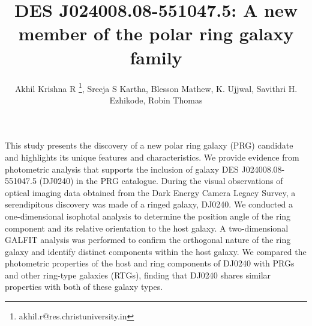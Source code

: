 \documentclass{aa}
\begin{document}
 


   \title{DES J024008.08-551047.5: A new member of the polar ring galaxy family}
   \author{Akhil Krishna R \thanks{akhil.r@res.christuniversity.in}, Sreeja S Kartha, Blesson Mathew, K. Ujjwal, Savithri H. Ezhikode, Robin Thomas }


 

  \abstract
   {}
   {This study presents the discovery of a new polar ring galaxy (PRG) candidate and highlights its unique features and characteristics. We provide evidence from photometric analysis that supports the inclusion of galaxy DES J024008.08-551047.5 (DJ0240) in the PRG catalogue.}
   {During the visual observations of optical imaging data obtained from the Dark Energy Camera Legacy Survey, a serendipitous discovery was made of a ringed galaxy, DJ0240. We conducted a one-dimensional isophotal analysis to determine the position angle of the ring component and its relative orientation to the host galaxy. A two-dimensional GALFIT analysis was performed to confirm the orthogonal nature of the ring galaxy and identify distinct components within the host galaxy. We compared the photometric properties of the host and ring components of DJ0240 with PRGs and other ring-type galaxies (RTGs), finding that DJ0240 shares similar properties with both of these galaxy types.}
\end{document}
